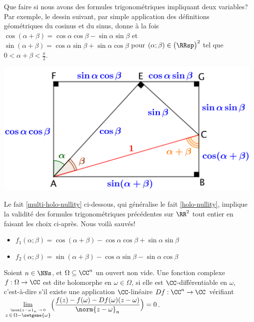 Que faire si nous avons des formules trigonométriques impliquant deux variables? Par exemple, le dessin suivant, par simple application des définitions géométriques du cosinus et du sinus, donne à la fois
$\cos(\alpha + \beta) = \cos \alpha \cos \beta - \sin \alpha \sin \beta$
et
$\sin(\alpha + \beta) = \cos \alpha \sin \beta + \sin \alpha \cos \beta$
pour
$(\alpha ; \beta) \in \big( \RRsp \big)^2$ tel que $0 < \alpha + \beta < \frac{\pi}{2}$. 

\begin{center}
	\includegraphics[scale=.7]{two-var-trig-formulas.png}
\end{center}

Le fait \ref{multi-holo-nullity} ci-dessous, qui généralise le fait \ref{holo-nullity}, implique la validité des formules trigonométriques précédentes sur $\RR^2$ tout entier en faisant les choix ci-après.
Nous voilà sauvés!
%
\begin{itemize}[label=\small\textbullet]
	\item $f_1(\alpha ; \beta) = \cos(\alpha + \beta) - \cos \alpha \cos \beta + \sin \alpha \sin \beta$

	\item $f_2(\alpha ; \beta) = \sin(\alpha + \beta) - \cos \alpha \sin \beta - \sin \alpha \cos \beta$
\end{itemize}


\begin{defi}
    Soient $n \in \NNs$, et $\Omega \subseteq \CC^n$ un ouvert non vide.
	Une fonction complexe $f: \Omega \rightarrow \CC$ est dite holomorphe en $\omega \in \Omega$, 
	si elle est $\CC$-différentiable en $\omega$,
	c'est-à-dire s'il existe une application $\CC$-linéaire $Df: \CC^n \rightarrow \CC$
	vérifiant
	$\displaystyle \lim_{\stackrel{\norm{z - \omega}_n \, \rightarrow \, 0}{z \, \in \, \Omega - \setgene{\omega}}}\!\Big( \frac{f(z) - f(\omega) - Df(\omega) (z - \omega)}{\norm{z - \omega}_n} \Big) = 0$.
\end{defi}


